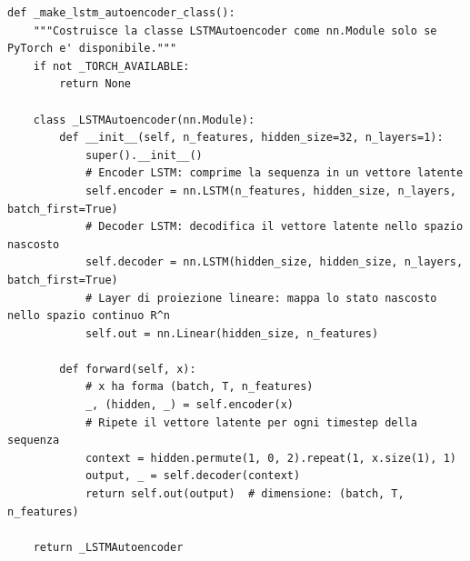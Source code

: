 \vspace{4pt}
\noindent\begin{minipage}{\textwidth}
\begin{lstlisting}
def _make_lstm_autoencoder_class():
    """Costruisce la classe LSTMAutoencoder come nn.Module solo se PyTorch e' disponibile."""
    if not _TORCH_AVAILABLE:
        return None

    class _LSTMAutoencoder(nn.Module):
        def __init__(self, n_features, hidden_size=32, n_layers=1):
            super().__init__()
            # Encoder LSTM: comprime la sequenza in un vettore latente
            self.encoder = nn.LSTM(n_features, hidden_size, n_layers, batch_first=True)
            # Decoder LSTM: decodifica il vettore latente nello spazio nascosto
            self.decoder = nn.LSTM(hidden_size, hidden_size, n_layers, batch_first=True)
            # Layer di proiezione lineare: mappa lo stato nascosto nello spazio continuo R^n
            self.out = nn.Linear(hidden_size, n_features)

        def forward(self, x):
            # x ha forma (batch, T, n_features)
            _, (hidden, _) = self.encoder(x)
            # Ripete il vettore latente per ogni timestep della sequenza
            context = hidden.permute(1, 0, 2).repeat(1, x.size(1), 1)
            output, _ = self.decoder(context)
            return self.out(output)  # dimensione: (batch, T, n_features)

    return _LSTMAutoencoder
\end{lstlisting}
\label{lst:lstm_pytorch}
\end{minipage}
\vspace{8pt}

